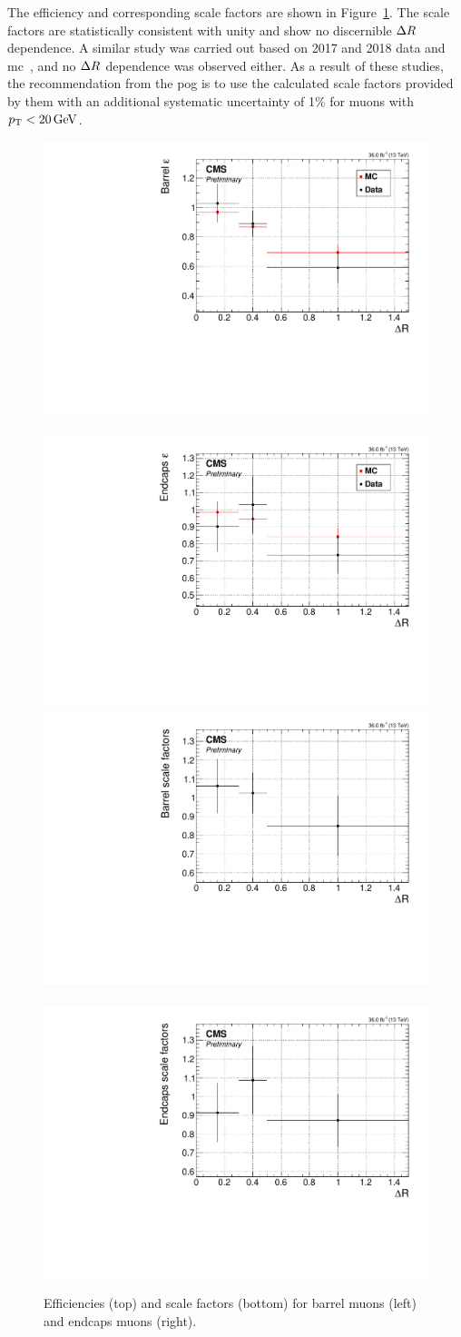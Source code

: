 The efficiency and corresponding scale factors are shown in Figure~\ref{fig:tb-eff-sf}. The scale factors are statistically consistent with unity and show no discernible $\Delta R$ dependence. A similar study was carried out based on 2017 and 2018 data and \gls{mc}~\cite{muon-id-sf-2017-8}, and no $\Delta R$ dependence was observed either. As a result of these studies, the recommendation from the \gls{pog} is to use the calculated scale factors provided by them with an additional systematic uncertainty of 1\% for muons with $p_{\mathrm{T}}<20\,\text{Ge\hspace{-.08em}V}$.

\begin{figure}[!htbp]
\centering
\includegraphics[width=0.48\linewidth]{plots/scale_factors/barrelDeltaRSingleElectron.pdf} \,
\includegraphics[width=0.48\linewidth]{plots/scale_factors/endcapsDeltaRSingleElectron.pdf}  \\
\includegraphics[width=0.48\linewidth]{plots/scale_factors/barrelDeltaRisoScaleFactorsSingleElectron.pdf} \,
\includegraphics[width=0.48\linewidth]{plots/scale_factors/endcapsDeltaRisoScaleFactorsSingleElectron.pdf} \\
\caption[Efficienciy values and scale factors]{Efficiencies (top) and scale factors (bottom) for barrel muons (left) and endcaps muons (right).}
\label{fig:tb-eff-sf}
\end{figure}